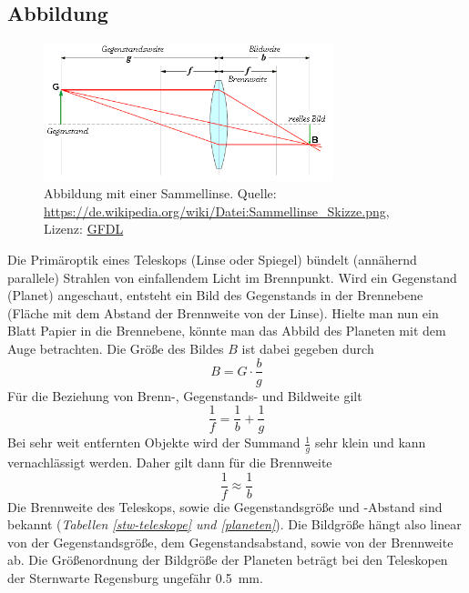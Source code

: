 \documentclass[10pt,a4paper,titlepage]{article}
\begin{document}
\subsection{Abbildung}
\label{sec:abbildung}
\begin{figure}[h!]
  \centering
    \includegraphics[width=0.75\textwidth]{Sammellinse}
  \caption{Abbildung mit einer Sammellinse. Quelle: \url{https://de.wikipedia.org/wiki/Datei:Sammellinse_Skizze.png}, Lizenz: \href{http://www.selflinux.org/selflinux/html/gfdl_de.html}{GFDL}}
  \label{fig:sammellinse}
\end{figure}
Die Primäroptik eines Teleskops (Linse oder Spiegel) bündelt (annähernd parallele) Strahlen von einfallendem Licht im Brennpunkt. Wird ein Gegenstand (Planet) angeschaut, entsteht ein Bild des Gegenstands in der Brennebene (Fläche mit dem Abstand der Brennweite von der Linse). Hielte man nun ein Blatt Papier in die Brennebene, könnte man das Abbild des Planeten mit dem Auge betrachten. Die Größe des Bildes $B$ ist dabei gegeben durch
\begin{equation}
\label{eq:bildgroesse}
B = G \cdot \frac{b}{g}
\end{equation}
Für die Beziehung von Brenn-, Gegenstands- und Bildweite gilt
\begin{equation}
\frac{1}{f} = \frac{1}{b}+\frac{1}{g}
\end{equation}
Bei sehr weit entfernten Objekte wird der Summand $\frac{1}{g}$ sehr klein und kann vernachlässigt werden. Daher gilt dann für die Brennweite
\begin{equation}
\label{eq:b-f}
\frac{1}{f} \approx \frac{1}{b}
\end{equation}
Die Brennweite des Teleskops, sowie die Gegenstandsgröße und -Abstand sind bekannt (\textit{Tabellen \ref{stw-teleskope} und \ref{planeten}}). Die Bildgröße hängt also linear von der Gegenstandsgröße, dem Gegenstandsabstand, sowie von der Brennweite ab. Die Größenordnung der Bildgröße der Planeten beträgt bei den Teleskopen der Sternwarte Regensburg ungefähr \SI{0.5}{\mm}.
\end{document}
